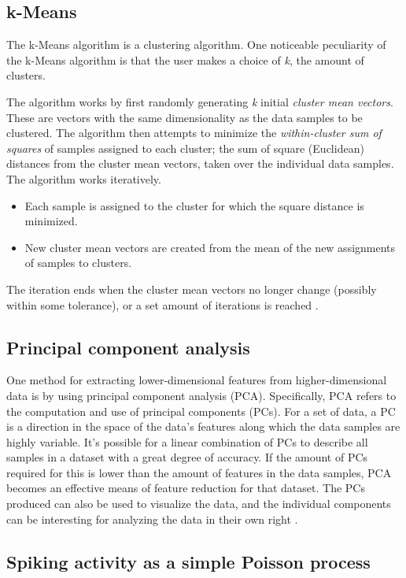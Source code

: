 \documentclass{article}
\begin{document}
\subsection{k-Means}\label{KM BG}

The k-Means algorithm is a clustering algorithm. 
One noticeable peculiarity of the k-Means algorithm is that the user makes a choice of \textit{k}, the amount of clusters. 

The algorithm works by first randomly generating \textit{k} initial \textit{cluster mean vectors}. 
These are vectors with the same dimensionality as the data samples to be clustered. 
The algorithm then attempts to minimize the \textit{within-cluster sum of squares} of samples assigned to each cluster; the sum of square (Euclidean) distances from the cluster mean vectors, taken over the individual data samples.
The algorithm works iteratively. 
\begin{itemize}
    \item Each sample is assigned to the cluster for which the square distance is minimized.
    \item New cluster mean vectors are created from the mean of the new assignments of samples to clusters.
\end{itemize}
The iteration ends when the cluster mean vectors no longer change (possibly within some tolerance), or a set amount of iterations is reached \citep[p258-260]{PractStats}.

\subsection{Principal component analysis}\label{PCA BG}

One method for extracting lower-dimensional features from higher-dimensional data is by using principal component analysis (PCA).
Specifically, PCA refers to the computation and use of principal components (PCs).
For a set of data, a PC is a direction in the space of the data's features along which the data samples are highly variable.
It's possible for a linear combination of PCs to describe all samples in a dataset with a great degree of accuracy.
If the amount of PCs required for this is lower than the amount of features in the data samples, PCA becomes an effective means of feature reduction for that dataset.
The PCs produced can also be used to visualize the data, and the individual components can be interesting for analyzing the data in their own right \citep[p374-380]{ISLR}.

\subsection{Spiking activity as a simple Poisson process}
\end{document}

